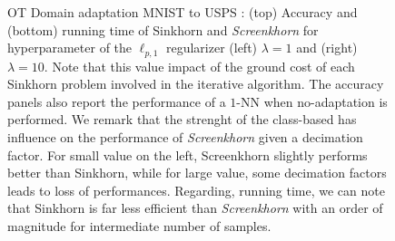 \begin{figure}[t]
	\caption{OT Domain adaptation MNIST to USPS : (top) Accuracy and (bottom) running time of Sinkhorn and \emph{Screenkhorn} for hyperparameter of the $\ell_{p,1}$ regularizer (left) $\lambda = 1$ and (right) $\lambda=10$. Note that this
	value impact of the ground cost of each Sinkhorn problem involved in the iterative algorithm. The accuracy panels
	also report the performance of a $1$-NN when no-adaptation is performed.  
	We remark that the strenght of the class-based has influence on the performance of \emph{Screenkhorn} given a decimation factor. For small value on the left, Screenkhorn slightly performs better than Sinkhorn, while for large value, some
	decimation factors leads to loss of performances.
	Regarding, running time, we can note that Sinkhorn is far less efficient than
	\emph{Screenkhorn}  with an order of magnitude for intermediate number of samples.
	\label{fig:otda:mnist:extra}}
\end{figure}

